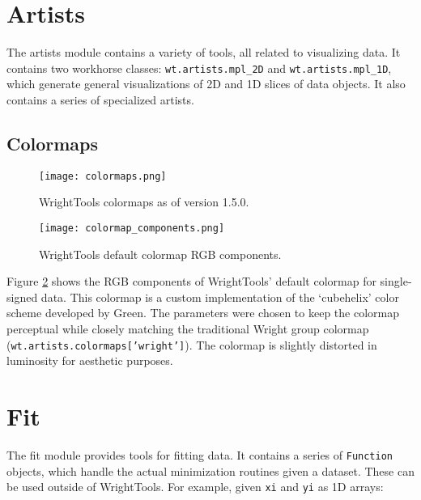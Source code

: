 \pagebreak
\section{Artists}

The artists module contains a variety of tools, all related to visualizing data. It contains two workhorse classes: \texttt{wt.artists.mpl\_2D} and \texttt{wt.artists.mpl\_1D}, which generate general visualizations of 2D and 1D slices of data objects. It also contains a series of specialized artists.

\subsection{Colormaps}

\begin{figure} \label{fig:colormaps}
	\begin{centering}
		\texttt{[image: colormaps.png]}
		\caption{WrightTools colormaps as of version 1.5.0.}
	\end{centering}
\end{figure}

\begin{figure} \label{fig:colormap components}
	\begin{centering}
		\texttt{[image: colormap\_components.png]}
		\caption{WrightTools default colormap RGB components.}
	\end{centering}
\end{figure}

Figure \ref{fig:colormap components} shows the RGB components of WrightTools' default colormap for single-signed data. This colormap is a custom implementation of the `cubehelix' color scheme developed by Green\cite{Green.2011.06}. The parameters were chosen to keep the colormap perceptual while closely matching the traditional Wright group colormap (\texttt{wt.artists.colormaps['wright']}). The colormap is slightly distorted in luminosity for aesthetic purposes.

\pagebreak
	\section{Fit} 
	
	The fit module provides tools for fitting data. It contains a series of \texttt{Function} objects, which handle the actual minimization routines given a dataset. These can be used outside of WrightTools. For example, given \texttt{xi} and \texttt{yi} as 1D arrays:
	
